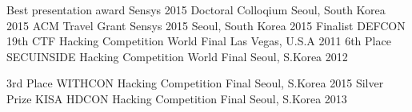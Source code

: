 
\begin{cvhonors}
  \cvhonor
    {Best presentation award}
    {Sensys 2015 Doctoral Colloqium}
    {Seoul, South Korea}
    {2015}
  \cvhonor
    {ACM Travel Grant}
    {Sensys 2015}
    {Seoul, South Korea}
    {2015}
  \cvhonor
    {Finalist}
    {DEFCON 19th CTF Hacking Competition World Final}
    {Las Vegas, U.S.A}
    {2011}
  \cvhonor
    {6th Place}
    {SECUINSIDE Hacking Competition World Final}
    {Seoul, S.Korea}
    {2012}
\end{cvhonors}

\begin{cvhonors}
  \cvhonor
    {3rd Place}
    {WITHCON Hacking Competition Final}
    {Seoul, S.Korea}
    {2015}
  \cvhonor
    {Silver Prize}
    {KISA HDCON Hacking Competition Final}
    {Seoul, S.Korea}
    {2013}
\end{cvhonors}
